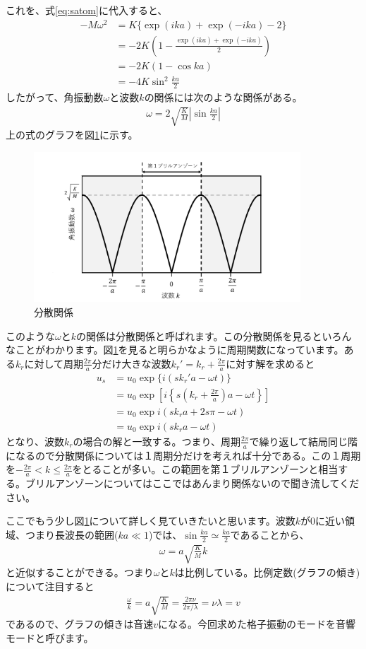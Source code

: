 \documentclass[10pt,b5paper,papersize,dvipdfmx]{jsbook}
\begin{document}
これを、式\ref{eq:satom}に代入すると、
\begin{align}
  -M\omega^2 &= K\{\exp(ika) + \exp(-ika) - 2\} \\
             &= -2K\left(1-\frac{\exp(ika) + \exp(-ika)}{2}\right) \\
             &= -2K(1-\cos ka)\\
             &= -4K\sin^2\frac{ka}{2}
\end{align}
したがって、角振動数$\omega$と波数$k$の関係には次のような関係がある。
\begin{align}
  \omega = 2 \sqrt{\frac{K}{M}} \left| \sin \frac{ka}{2}\right|
\end{align}
上の式のグラフを図\ref{fig:bunnsan}に示す。
\begin{figure}[htbp]
  \centering
  \includegraphics[width=10cm]{img/bunsann.pdf}  %
  \caption{分散関係}
  \label{fig:bunnsan}
\end{figure}
このような$\omega$と$k$の関係は分散関係と呼ばれます。この分散関係を見るといろんなことがわかります。図\ref{fig:bunnsan}を見ると明らかなように周期関数になっています。ある$k_r$に対して周期$\frac{2\pi}{a}$分だけ大きな波数$k_r' = k_r + \frac{2\pi}{a}$に対す解を求めると
\begin{align}
  u_s &= u_0 \exp\{i(sk_r'a - \omega t)\}\\
      &= u_0 \exp \left[i\left\{s \left(k_r + \frac{2\pi}{a}\right)a-\omega t\right\}\right]\\
      & = u_0 \exp {i(sk_ra + 2s\pi - \omega t)}\\
      & = u_0 \exp {i(sk_ra -\omega t)}
\end{align}
となり、波数$k_r$の場合の解と一致する。つまり、周期$\frac{2\pi}{a}$で繰り返して結局同じ階になるので分散関係については１周期分だけを考えれば十分である。この１周期を$-\frac{2\pi}{a} < k\leq \frac{2\pi}{a}$をとることが多い。この範囲を第１ブリルアンゾーンと相当する。ブリルアンゾーンについてはここではあんまり関係ないので聞き流してください。\par
ここでもう少し図\ref{fig:bunnsan}について詳しく見ていきたいと思います。波数$k$が$0$に近い領域、つまり長波長の範囲($ka \ll 1$)では、$\sin \frac{ka}{2} \simeq \frac{ka}{2}$であることから、
\begin{align}
  \omega = a \sqrt{\frac{K}{M}}k
\end{align}
と近似することができる。つまり$\omega$と$k$は比例している。比例定数(グラフの傾き)について注目すると
\begin{align}
  \frac{\omega}{k} =a \sqrt{\frac{K}{M}}= \frac{2\pi\nu}{2\pi/\lambda} = \nu \lambda = v
\end{align}
であるので、グラフの傾きは音速$v$になる。今回求めた格子振動のモードを音響モードと呼びます。
\end{document}
